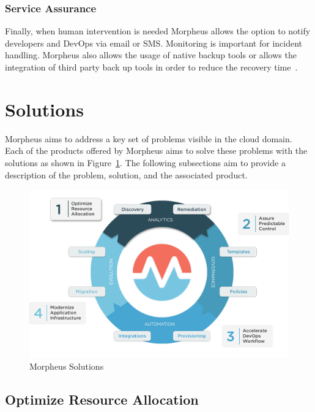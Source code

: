 \subsubsection{Service Assurance}

Finally, when human intervention is needed Morpheus allows the option to notify 
developers and DevOps via email or SMS. Monitoring is important for incident 
handling. Morpheus also allows the usage of native backup tools or allows the 
integration of third party back up tools in order to reduce the recovery 
time~\cite{hid-sp18-416-www-morpheus-architecture}. 

\section{Solutions}
\label{sec:solutions}

Morpheus aims to address a key set of problems visible in the cloud domain. 
Each of the products offered by Morpheus aims to solve these problems with the 
solutions as shown in Figure~\ref{fig:solutions}. The following subsections aim 
to provide a description of the problem, solution, and the associated product.

\begin{figure}[htb]
	\centering
	\includegraphics[width=\columnwidth]{../images/MorpheusSolutions.png}
	\caption{Morpheus Solutions~\cite{hid-sp18-416-www-morpheus-solutions}}
\label{fig:solutions}
\end{figure}


\subsection{Optimize Resource Allocation}

